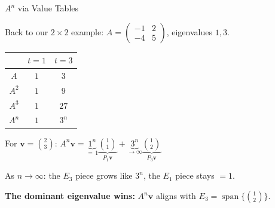 \documentclass[10pt]{beamer}
\theoremstyle{definition}
\newcommand{\x}[1]{\alert{\textbf{#1}}}
\begin{document}
%
\begin{frame}[shrink=5]{$A^n$ via Value Tables}

Back to our $2 \times 2$ example: $A = \begin{pmatrix}-1&2\\-4&5\end{pmatrix}$, eigenvalues $1, 3$.

\vfill

\begin{center}
\renewcommand{\arraystretch}{1.3}
\begin{tabular}{c|cc}
 & $t = 1$ & $t = 3$ \\
\hline
$A$ & $1$ & $3$ \\
$A^2$ & $1$ & $9$ \\
$A^3$ & $1$ & $27$ \\
$A^n$ & $1$ & $3^n$
\end{tabular}
\end{center}

\vfill\pause

For $\mathbf{v} = \binom{2}{3}$: \quad $A^n \mathbf{v} = \underbrace{1^n}_{=\,1}\underbrace{\binom{1}{1}}_{P_1\mathbf{v}} + \underbrace{3^n}_{\to \infty}\underbrace{\binom{1}{2}}_{P_3\mathbf{v}}$

\vfill

As $n \to \infty$: the $E_3$ piece grows like $3^n$, the $E_1$ piece stays $= 1$.

\vfill

\x{The dominant eigenvalue wins:} $A^n \mathbf{v}$ aligns with $E_3 = \operatorname{span}\bigl\{\binom{1}{2}\bigr\}$.

\end{frame}
\end{document}

